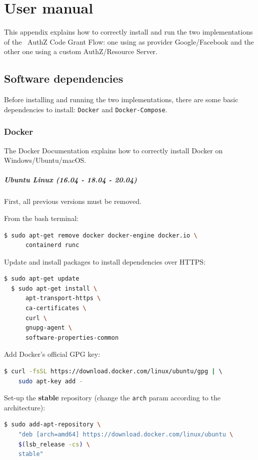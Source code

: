 \appendix
\chapter{User manual}
This appendix explains how to correctly install and run the two implementations of the \oauth\ AuthZ Code Grant Flow: one using as provider Google/Facebook and the other one using a custom AuthZ/Resource Server.

\minitoc

\section{Software dependencies}
\label{appa}
Before installing and running the two implementations, there are some basic dependencies to install: \texttt{Docker} and \texttt{Docker-Compose}.

\subsection{Docker}
\label{ublin}
The Docker Documentation \cite{docker} explains how to correctly install Docker on Windows/Ubuntu/macOS.

\paragraph{Ubuntu Linux (16.04 - 18.04 - 20.04)} First, all previous versions must be removed. 

\noindent From the bash terminal:
\begin{lstlisting}[language=bash]
  $ sudo apt-get remove docker docker-engine docker.io \
      containerd runc
\end{lstlisting}

\noindent Update and install packages to install dependencies over HTTPS:
\begin{lstlisting}[language=bash]
  $ sudo apt-get update
  $ sudo apt-get install \
      apt-transport-https \
      ca-certificates \
      curl \
      gnupg-agent \
      software-properties-common
\end{lstlisting}

\noindent Add Docker’s official GPG key:
\begin{lstlisting}[language=bash, showstringspaces=false, basicstyle=\ttfamily]
  $ curl -fsSL https://download.docker.com/linux/ubuntu/gpg | \ 
    sudo apt-key add -
\end{lstlisting}

\noindent Set-up the \textbf{stable} repository (change the \texttt{arch} param according to the architecture):
\begin{lstlisting}[language=bash, showstringspaces=false, basicstyle=\ttfamily]
  $ sudo add-apt-repository \
    "deb [arch=amd64] https://download.docker.com/linux/ubuntu \
    $(lsb_release -cs) \
    stable"
\end{lstlisting}

